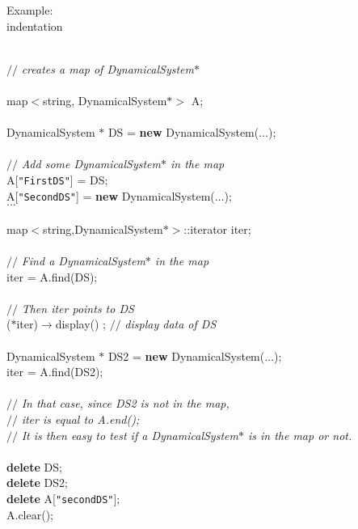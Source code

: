 \documentclass[10pt]{article}
\begin{document}
Example:\\
\expandafter\ifx\csname indentation\endcsname\relax%
\newlength{\indentation}\fi
\setlength{\indentation}{0.5em}
\begin{flushleft}
\mbox{}\\
{$//$\it{} creates a map of DynamicalSystem$\ast${}\mbox{}\\
}\mbox{}\\
map$<$string, DynamicalSystem$\ast$$>$ A;\mbox{}\\
\mbox{}\\
DynamicalSystem $\ast$ DS = {\bf new} DynamicalSystem($\ldots$);\mbox{}\\
\mbox{}\\
{$//$\it{} Add some DynamicalSystem$\ast$ in the map{}\mbox{}\\
}A[{\tt"FirstDS"}] = DS;\mbox{}\\
A[{\tt"SecondDS"}] = {\bf new} DynamicalSystem($\ldots$);\mbox{}\\
$\ldots$\mbox{}\\
\mbox{}\\
map$<$string,DynamicalSystem$\ast$$>$::iterator iter;\mbox{}\\
\mbox{}\\
{$//$\it{} Find a DynamicalSystem$\ast$ in the map{}\mbox{}\\
}iter = A.find(DS);\mbox{}\\
\mbox{}\\
{$//$\it{} Then iter points to DS{}\mbox{}\\
}($\ast$iter)$\rightarrow$display() ; {$//$\it{} display data of DS{}\mbox{}\\
}\mbox{}\\
DynamicalSystem $\ast$ DS2 = {\bf new} DynamicalSystem($\ldots$);\mbox{}\\
iter = A.find(DS2);\mbox{}\\
\mbox{}\\
{$//$\it{} In that case, since DS2 is not in the map, {}\mbox{}\\
}{$//$\it{} iter is equal to A.end();{}\mbox{}\\
}{$//$\it{} It is then easy to test if a DynamicalSystem$\ast$ is in the map or not.{}\mbox{}\\
}\mbox{}\\
{\bf delete} DS;\mbox{}\\
{\bf delete} DS2;\mbox{}\\
{\bf delete} A[{\tt"secondDS"}];\mbox{}\\
A.clear();\mbox{}\\
\hspace*{1\indentation}\mbox{}\\
\end{flushleft}
\end{document}
